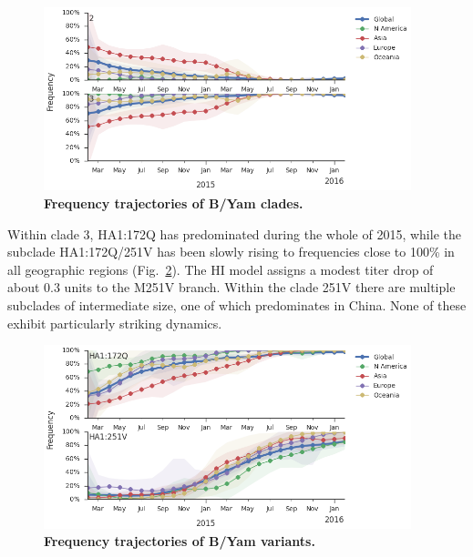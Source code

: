 \documentclass[11pt,oneside,letterpaper]{article}
\begin{document}
\begin{figure}[h!]
	\centering		
	\includegraphics[width=0.95\textwidth]{../figures/feb-2016/Yam_clades.png}
	\caption{\textbf{Frequency trajectories of B/Yam clades.} 
	}
	\label{Yam_clades}
\end{figure}

\pagebreak

Within clade 3, HA1:172Q has predominated during the whole of 2015, while the subclade HA1:172Q/251V has been slowly rising to frequencies close to 100\% in all geographic regions (Fig.\ \ref{Yam_mutations}). The HI model \cite{neher2015prediction} assigns a modest titer drop of about 0.3 units to the M251V branch. Within the clade 251V there are multiple subclades of intermediate size, one of which predominates in China. None of these exhibit particularly striking dynamics.

\begin{figure}[h!]
	\centering		
	\includegraphics[width=0.95\textwidth]{../figures/feb-2016/Yam_mutations.png}
	\caption{\textbf{Frequency trajectories of B/Yam variants.} 
	}
	\label{Yam_mutations}
\end{figure}



\end{document}

